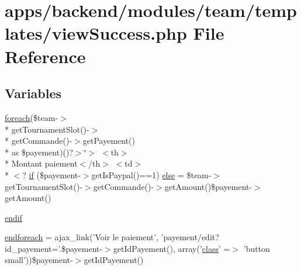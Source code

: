 \hypertarget{backend_2modules_2team_2templates_2view_success_8php}{\section{apps/backend/modules/team/templates/view\-Success.php File Reference}
\label{backend_2modules_2team_2templates_2view_success_8php}
}
\subsection*{Variables}
\begin{DoxyCompactItemize}
\item 
\hyperlink{presse_2modules_2news_2templates_2index_success_8php_abc56db52b2e9a59bcd5c9e45ac5cb332}{foreach}(\$team-\/$>$\\*
get\-Tournament\-Slot()-\/$>$\\*
get\-Commande()-\/$>$get\-Payement() \\*
as \$payement)()?$>$\char`\"{}$>$ $<$th$>$\\*
Montant paiement$<$/th$>$ $<$td$>$ \\*
$<$? \hyperlink{live_2modules_2tournament_2templates_2__form_team_8php_ae30a307b320d8da5d9a945eaf68f7549}{if} (\$payement-\/$>$get\-Is\-Paypal()==1) \hyperlink{backend_2modules_2team_2templates_2view_success_8php_a77770acd5e565312bd73892fa48fe037}{else} = \$team-\/$>$get\-Tournament\-Slot()-\/$>$get\-Commande()-\/$>$get\-Amount()\$payement-\/$>$get\-Amount()
\item 
\hyperlink{backend_2modules_2team_2templates_2view_success_8php_a6d7c1eb108058e946fe57a74fd262298}{endif}
\item 
\hyperlink{backend_2modules_2team_2templates_2view_success_8php_a672d9707ef91db026c210f98cc601123}{endforeach} = ajax\-\_\-link('Voir le paiement', 'payement/edit?id\-\_\-payement='.\$payement-\/$>$get\-Id\-Payement(), array('\hyperlink{live_2modules_2news_2templates_2__actualitelight_8php_a185c73c6507391d1eb38c776b68ce96d}{class}' =$>$ 'button small'))\$payement-\/$>$get\-Id\-Payement()
\end{DoxyCompactItemize}



